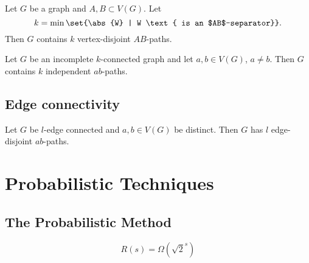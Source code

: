 \documentclass{article}
\begin{document}
\begin{nthm}\label{thm:34}
    Let $G$ be a graph and $A,B \subset V(G)$.
    Let
    \begin{equation*}
        k = \min \set{\abs{W} | W \text{ is an $AB$-separator}}.
    \end{equation*}
    Then $G$ contains $k$ vertex-disjoint $AB$-paths.
\end{nthm}





\begin{ncor}\label{cor:35}
    Let $G$ be an incomplete $k$-connected graph and let $a,b \in V(G)$, $a \neq b$.
    Then $G$ contains $k$ independent $ab$-paths.
\end{ncor}































\subsection{Edge connectivity}

\begin{ncor}\label{cor:36}
    Let $G$ be $l$-edge connected and $a,b \in V(G)$ be distinct.
    Then $G$ has $l$ edge-disjoint $ab$-paths.
\end{ncor}

\clearpage
\section{Probabilistic Techniques}
\subsection{The Probabilistic Method}







\begin{nthm}[Erd\H{o}s]\label{thm:37}
    \begin{equation*}
        R(s) = \Omega(\sqrt{2}^s)
    \end{equation*}
\end{nthm}
\end{document}
